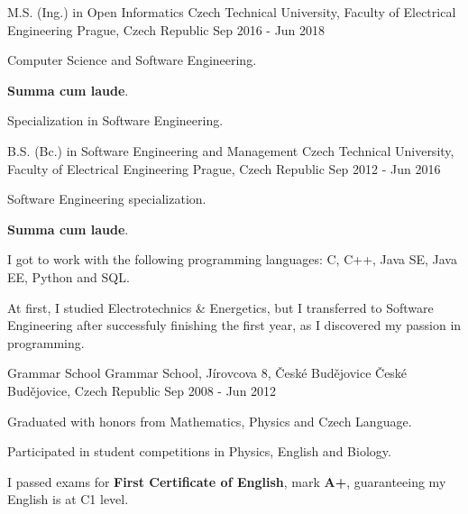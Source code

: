 \begin{cventries}
  \cventry
    {M.S. (Ing.) in Open Informatics}
    {Czech Technical University, Faculty of Electrical Engineering}
    {Prague, Czech Republic}
    {Sep 2016 - Jun 2018}
    {
      \begin{cvitems}
        \item {Computer Science and Software Engineering.}
        \item {\textbf{Summa cum laude}.}
        \item {Specialization in Software Engineering.}
      \end{cvitems}
    }

  \cventry
    {B.S. (Bc.) in Software Engineering and Management}
    {Czech Technical University, Faculty of Electrical Engineering}
    {Prague, Czech Republic}
    {Sep 2012 - Jun 2016}
    {
      \begin{cvitems}
        \item {Software Engineering specialization.}
        \item {\textbf{Summa cum laude}.}
        \item {I got to work with the following programming languages: C, C++, Java SE, Java EE, Python and SQL.}
        \item {At first, I studied Electrotechnics \& Energetics, but I transferred to Software Engineering after successfuly finishing the first year, as I discovered my passion in programming.}
      \end{cvitems}
    }

  \cventry
    {Grammar School}
    {Grammar School, Jírovcova 8, České Budějovice}
    {České Budějovice, Czech Republic}
    {Sep 2008 - Jun 2012}
    {
      \begin{cvitems}
        \item {Graduated with honors from Mathematics, Physics and Czech Language.}
        \item {Participated in student competitions in Physics, English and Biology.}
        \item {I passed exams for \textbf{First Certificate of English}, mark \textbf{A+}, guaranteeing my English is at C1 level.}
      \end{cvitems}
    }
\end{cventries}
